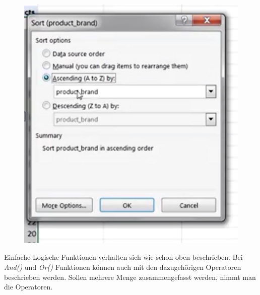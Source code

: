 \begin{figure}[H]
	\centering
	\includegraphics[scale = 0.3]{attachment/chapter_1/screenshot092}
	\caption{}
	\label{fig:screenshot092}
\end{figure}
Einfache Logische Funktionen verhalten sich wie schon oben beschrieben. Bei \textit{And()} und \textit{Or()} Funktionen können auch mit den dazugehörigen Operatoren beschrieben werden. Sollen mehrere Menge zusammengefasst werden, nimmt man die Operatoren.
